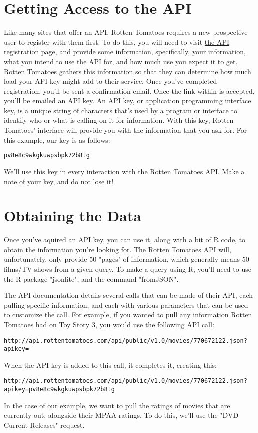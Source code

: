 \documentclass{article}
\begin{document}
\section*{Getting Access to the API}
Like many sites that offer an API, Rotten Tomatoes requires a new prospective user to register with them first. To do this, you will need to visit \href{http://developer.rottentomatoes.com/member/register}{the API registration page}, and provide some information, specifically, your information, what you intend to use the API for, and how much use you expect it to get. Rotten Tomatoes gathers this information so that they can determine how much load your API key might add to their service. Once you've completed registration, you'll be sent a confirmation email. Once the link within is accepted, you'll be emailed an API key. An API key, or application programming interface key, is a unique string of characters that's used by a program or interface to identify who or what is calling on it for information. With this key, Rotten Tomatoes' interface will provide you with the information that you ask for. For this example, our key is as follows:
\begin{lstlisting}[label=APIKey,caption=API Key]
  pv8e8c9wkgkuwpsbpk72b8tg
\end{lstlisting}
We'll use this key in every interaction with the Rotten Tomatoes API. Make a note of your key, and do not lose it!

\section*{Obtaining the Data}
Once you've aquired an API key, you can use it, along with a bit of R code, to obtain the information you're looking for. The Rotten Tomatoes API will, unfortunately, only provide 50 "pages" of information, which generally means 50 films/TV shows from a given query. To make a query using R, you'll need to use the R package "jsonlite", and the command "fromJSON". 

The API documentation details several calls that can be made of their API, each pulling specific information, and each with various parameters that can be used to customize the call. For example, if you wanted to pull any information Rotten Tomatoes had on Toy Story 3, you would use the following API call:
\begin{lstlisting}[label=ToyStory3Info,caption=API Call]
  http://api.rottentomatoes.com/api/public/v1.0/movies/770672122.json?apikey=
\end{lstlisting}
When the API key is added to this call, it completes it, creating this:
\begin{lstlisting}[label=ToyStory3Info,caption=API Request]
  http://api.rottentomatoes.com/api/public/v1.0/movies/770672122.json?apikey=pv8e8c9wkgkuwpsbpk72b8tg
\end{lstlisting}
In the case of our example, we want to pull the ratings of movies that are currently out, alongside their MPAA ratings. To do this, we'll use the "DVD Current Releases" request.
\end{document}

